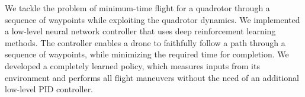 We tackle the problem of minimum-time flight for a quadrotor through a sequence of waypoints while exploiting the quadrotor dynamics. We implemented a low-level neural network controller that uses deep reinforcement learning methods. The controller enables a drone to faithfully follow a path through a sequence of waypoints, while minimizing the required time for completion. We developed a completely learned policy, which measures inputs from its environment and performs all flight maneuvers without the need of an additional low-level PID controller. 
